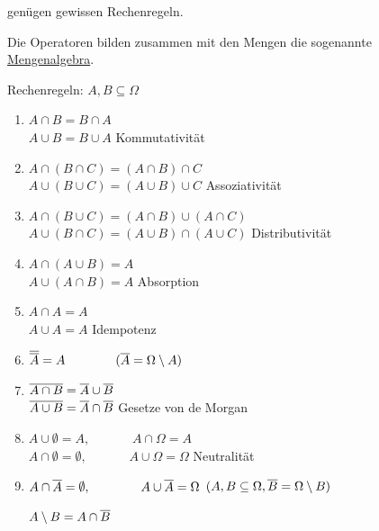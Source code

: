 	genügen gewissen Rechenregeln.
	
	Die Operatoren bilden zusammen mit den Mengen die sogenannte \underline{Mengenalgebra}.

	Rechenregeln: $A,B \subseteq \Omega$
	\begin{enumerate}
		\item $A \cap B = B \cap A$\\
		$A \cup B = B \cup A$
		\hfill{Kommutativität}
		\item $A \cap (B \cap C) = (A \cap B) \cap C$\\
		$A \cup (B \cup C) = (A \cup B) \cup C$
		\hfill{Assoziativität}
		\item $A \cap (B \cup C) = (A \cap B) \cup (A \cap C)$\\
		$A \cup (B \cap C) = (A \cup B) \cap (A \cup C)$
		\hfill{Distributivität}
		\item $A\cap (A\cup B) = A$\\
		$A\cup (A\cap B) = A$
		\hfill{Absorption}
		\item $A\cap A = A$\\
		$A\cup A = A$
		\hfill{Idempotenz}
		\item $\overline{\overline{A}} = A \hspace{40pt} (\overline{A} = \Omega \setminus A)$
		\item $\overline{A\cap B} = \overline{A} \cup \overline{B}$\\
		$\overline{A\cup B} = \overline{A} \cap \overline{B}$
		\hfill{Gesetze von de Morgan}
		\item $A \cup \emptyset = A, \hspace{40pt} A\cap \Omega = A$\\
		$A \cap \emptyset = \emptyset, \hspace{40pt} A\cup \Omega = \Omega$
		\hfill{Neutralität}
		\item $A \cap \overline{A} = \emptyset, \hspace{40pt} A\cup \overline{A} = \Omega$
		\Beachte $(A,B \subseteq \Omega, \overline{B} = \Omega \setminus B)$
		
		$A\setminus B = A \cap \overline{B}$
	\end{enumerate}
	
